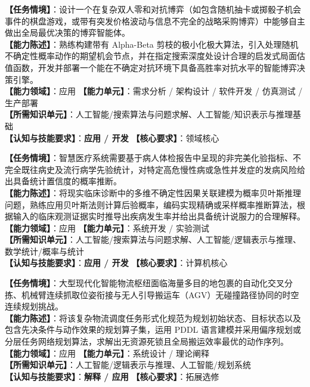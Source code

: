 \begin{taskbox}[任务 2：不确定环境下双人博弈策略智能体]
\textbf{【任务情境】}：设计一个在复杂双人零和对抗博弈（如包含随机抽卡或掷骰子机会事件的棋盘游戏，或带有突发价格波动与信息不完全的战略采购博弈）中能够自主做出全局最优决策的博弈智能体。\\
\textbf{【能力陈述】}：熟练构建带有 Alpha-Beta 剪枝的极小化极大算法，引入处理随机不确定性概率动作的期望机会节点，并在指定搜索深度处设计合理的启发式局面估值函数，开发并部署一个能在不确定对抗环境下具备高胜率对抗水平的智能博弈决策引擎。\\
\textbf{【能力领域】}：应用 \quad \textbf{【能力单元】}：需求分析 / 架构设计 / 软件开发 / 仿真测试 / 生产部署\\
\textbf{【所需知识单元】}：人工智能/搜索算法与问题求解、人工智能/知识表示与推理基础\\
\textbf{【认知与技能要求】}：\textbf{应用 / 开发} \quad \textbf{【核心要求】}：领域核心
\end{taskbox}

\begin{taskbox}[任务 3：基于多源体检数据的疾病患病概率贝叶斯预测系统]
\textbf{【任务情境】}：智慧医疗系统需要基于病人体检报告中呈现的非完美化验指标、不完全既往病史及流行病学先验统计，对特定高危慢性病或急性并发症的发病风险给出具备统计置信度的概率推断。\\
\textbf{【能力陈述】}：将现实临床诊断中的多维不确定性因果关联建模为概率贝叶斯推理问题，熟练应用贝叶斯法则计算后验概率，编码实现精确或采样概率推断算法，根据输入的临床观测证据实时推导出疾病发生率并给出具备统计说服力的合理解释。\\
\textbf{【能力领域】}：应用 \quad \textbf{【能力单元】}：系统开发 / 实验测试\\
\textbf{【所需知识单元】}：人工智能/搜索算法与问题求解、人工智能/逻辑表示与推理、数学统计/概率与统计\\
\textbf{【认知与技能要求】}：\textbf{应用 / 开发} \quad \textbf{【核心要求】}：计算机核心
\end{taskbox}

\begin{taskbox}[任务 4：现代复杂物流调度与分拣规划求解器]
\textbf{【任务情境】}：大型现代化智能物流枢纽面临海量多目的地包裹的自动化交叉分拣、机械臂连续抓取位姿衔接与无人引导搬运车（AGV）无碰撞路径协同的时空连续规划挑战。\\
\textbf{【能力陈述】}：将该复杂物流调度任务形式化规范为规划初始状态、目标状态以及包含先决条件与动作效果的规划算子集，运用 PDDL 语言建模并采用偏序规划或分层任务网络规划算法，求解出无资源死锁且全局搬运效率最优的动作序列。\\
\textbf{【能力领域】}：应用 \quad \textbf{【能力单元】}：系统设计 / 理论阐释\\
\textbf{【所需知识单元】}：人工智能/逻辑表示与推理、人工智能/规划系统\\
\textbf{【认知与技能要求】}：\textbf{解释 / 应用} \quad \textbf{【核心要求】}：拓展选修
\end{taskbox}

